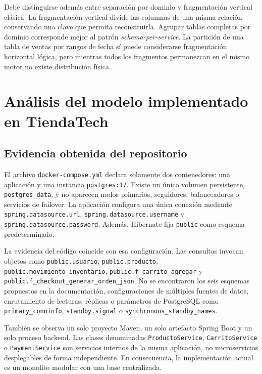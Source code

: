 \documentclass[11pt,a4paper]{article}
\begin{document}
Debe distinguirse además entre separación por dominio y fragmentación vertical clásica. La fragmentación vertical divide las columnas de una misma relación conservando una clave que permita reconstruirla. Agrupar tablas completas por dominio corresponde mejor al patrón \emph{schema-per-service}. La partición de una tabla de ventas por rangos de fecha sí puede considerarse fragmentación horizontal lógica, pero mientras todos los fragmentos permanezcan en el mismo motor no existe distribución física.

\section{Análisis del modelo implementado en TiendaTech}

\subsection{Evidencia obtenida del repositorio}

El archivo \texttt{docker-compose.yml} declara solamente dos contenedores: una aplicación y una instancia \texttt{postgres:17}. Existe un único volumen persistente, \texttt{postgres\_data}, y no aparecen nodos primarios, seguidores, balanceadores o servicios de failover. La aplicación configura una única conexión mediante \texttt{spring.datasource.url}, \texttt{spring.datasource.username} y \texttt{spring.datasource.password}. Además, Hibernate fija \texttt{public} como esquema predeterminado.

La evidencia del código coincide con esa configuración. Las consultas invocan objetos como \texttt{public.usuario}, \texttt{public.producto}, \texttt{public.movimiento\_inventario}, \texttt{public.f\_carrito\_agregar} y \texttt{public.f\_checkout\_generar\_orden\_json}. No se encontraron los seis esquemas propuestos en la documentación, configuraciones de múltiples fuentes de datos, enrutamiento de lecturas, réplicas o parámetros de PostgreSQL como \texttt{primary\_conninfo}, \texttt{standby.signal} o \texttt{synchronous\_standby\_names}.

También se observa un solo proyecto Maven, un solo artefacto Spring Boot y un solo proceso backend. Las clases denominadas \texttt{ProductoService}, \texttt{CarritoService} o \texttt{PaymentService} son servicios internos de la misma aplicación, no microservicios desplegables de forma independiente. En consecuencia, la implementación actual es un monolito modular con una base centralizada.
\end{document}
